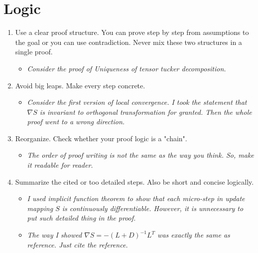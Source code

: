 \documentclass[11pt]{article}
\begin{document}
\section{Logic}
\begin{enumerate}
    \item Use a clear proof structure. You can prove step by step from assumptions to the goal or you can use contradiction. Never mix these two structures in a single proof. 
    \begin{itemize}
        \item \textit{Consider the proof of Uniqueness of tensor tucker decomposition.}
    \end{itemize}
    \item Avoid big leaps. Make every step concrete.
    \begin{itemize}
        \item \textit{Consider the first version of local convergence. I took the statement that $\nabla S$ is invariant to orthogonal transformation for granted. Then the whole proof went to a wrong direction.}
    \end{itemize}
    \item Reorganize. Check whether your proof logic is a "chain".
    \begin{itemize}
        \item \textit{The order of proof writing is not the same as the way you think. So, make it readable for reader.}
    \end{itemize}
    \item Summarize the cited or too detailed steps. Also be short and concise logically.
    \begin{itemize}
        \item \textit{ I used implicit function theorem to show that each micro-step in update mapping $S$ is continuously differentiable. However, it is unnecessary to put such detailed thing in the proof.}
        \item \textit{The way I showed $\nabla S = -(L+D)^{-1} L^T$ was exactly the same as reference. Just cite the reference. }
    \end{itemize}
\end{enumerate}
\end{document}
